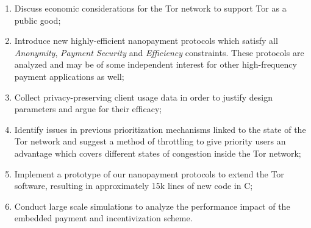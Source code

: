 \begin{enumerate}
\item Discuss economic considerations for the Tor network %
  to support Tor as a public good;
\item Introduce new highly-efficient nanopayment protocols which satisfy all
  \emph{Anonymity}, \emph{Payment Security} and \emph{Efficiency}
  constraints. These protocols are %
  analyzed and may be of some independent interest for
  other high-frequency payment applications as well;
\item Collect privacy-preserving client usage data in order to justify design parameters
  and argue for their efficacy;
\item Identify issues in previous prioritization mechanisms linked to the state of the Tor network and suggest a method of throttling to give priority users an
  advantage which covers different states of congestion inside the Tor network;
\item Implement a prototype of our nanopayment protocols to extend the
  Tor software, resulting in approximately 15k lines of new code in C;
\item Conduct large scale simulations to analyze the performance impact of the
  embedded payment and incentivization scheme.
\end{enumerate}


